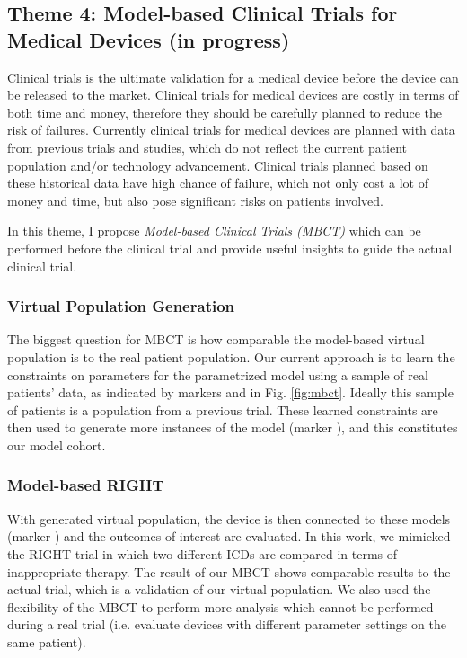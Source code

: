 \documentclass[a4paper]{article}
\newcommand*\circled[1]{\tikz[baseline=(char.base)]{
		\node[shape=circle,draw,inner sep=2pt] (char) {#1};}}
\begin{document}
\subsection{Theme 4: Model-based Clinical Trials for Medical Devices (in progress)}
Clinical trials is the ultimate validation for a medical device before the device can be released to the market.
Clinical trials for medical devices are costly in terms of both time and money, therefore they should be carefully planned to reduce the risk of failures.
Currently clinical trials for medical devices are planned with data from previous trials and studies, which do not reflect the current patient population and/or technology advancement.
Clinical trials planned based on these historical data have high chance of failure, which not only cost a lot of money and time, but also pose significant risks on patients involved.

In this theme, I propose \emph{Model-based Clinical Trials (MBCT)} which can be performed before the clinical trial and provide useful insights to guide the actual clinical trial.
\subsubsection{Virtual Population Generation}
The biggest question for MBCT is how comparable the model-based virtual population is to the real patient population. 
Our current approach is to learn the constraints on parameters for the parametrized model using a sample of real patients' data, as indicated by markers \circled{1} and \circled{2} in Fig. \ref{fig:mbct}. 
Ideally this sample of patients is a population from a previous trial.
These learned constraints are then used to generate more instances of the model (marker \circled{3}), and this constitutes our model cohort.

\subsubsection{Model-based RIGHT}
With generated virtual population, the device is then connected to these models (marker \circled{4}) and the outcomes of interest are evaluated.
In this work, we mimicked the RIGHT trial in which two different ICDs are compared in terms of inappropriate therapy.
The result of our MBCT shows comparable results to the actual trial, which is a validation of our virtual population.
We also used the flexibility of the MBCT to perform more analysis which cannot be performed during a real trial (i.e. evaluate devices with different parameter settings on the same patient).
\end{document}

